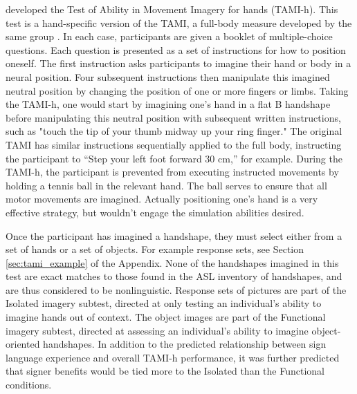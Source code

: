              developed the Test of Ability in Movement Imagery for hands (TAMI-h). This test is a hand-specific version of the TAMI, a full-body measure developed by the same group \cite{madan2013}. In each case, participants are given a booklet of multiple-choice questions. Each question is presented as a set of instructions for how to position oneself. The first instruction asks participants to imagine their hand or body in a neural position. Four subsequent instructions then manipulate this imagined neutral position by changing the position of one or more fingers or limbs. Taking the TAMI-h, one would start by imagining one’s hand in a flat B handshape before manipulating this neutral position with subsequent written instructions, such as "touch the tip of your thumb midway up your ring finger." The original TAMI has similar instructions sequentially applied to the full body, instructing the participant to “Step your left foot forward 30 cm,” for example. During the TAMI-h, the participant is prevented from executing instructed movements by holding a tennis ball in the relevant hand. The ball serves to ensure that all motor movements are imagined.  Actually positioning one’s hand is a very effective strategy, but wouldn’t engage the simulation abilities desired. \par
            Once the participant has imagined a handshape, they must select either from a set of hands or a set of objects. For example response sets, see Section \ref{sec:tami_example} of the Appendix. None of the handshapes imagined in this test are exact matches to those found in the ASL inventory of handshapes, and are thus considered to be nonlinguistic. Response sets of pictures are part of the Isolated imagery subtest, directed at only testing an individual's ability to imagine hands out of context. The object images are part of the Functional imagery subtest, directed at assessing an individual's ability to imagine object-oriented handshapes. In addition to the predicted relationship between sign language experience and overall TAMI-h performance, it was further predicted that signer benefits would be tied more to the Isolated than the Functional conditions. \par
